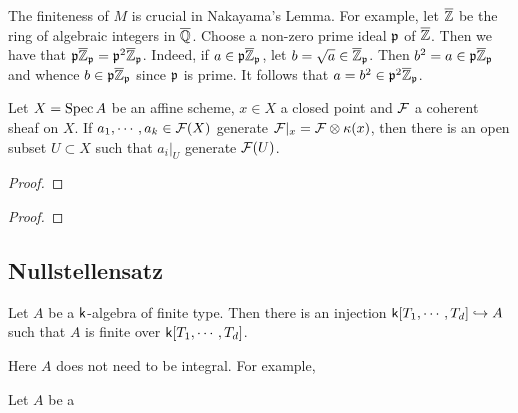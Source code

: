     \begin{remark}\label{rem: counterexample of Nakayama's lemma when M is not finite}
        The finiteness of $M$ is crucial in Nakayama's Lemma.
        For example, let \(\overline{{\mathbb{Z}}}\) be the ring of algebraic integers in \(\overline{{\mathbb{Q}}}\).
        Choose a non-zero prime ideal \({\mathfrak{p}}\) of \(\overline{{\mathbb{Z}}}\).
        Then we have that \({\mathfrak{p}} \overline{{\mathbb{Z}}}_{\mathfrak{p}}= {\mathfrak{p}}^2 \overline{{\mathbb{Z}}}_{\mathfrak{p}}\).
        Indeed, if \(a \in {\mathfrak{p}} \overline{{\mathbb{Z}}}_{\mathfrak{p}}\), let \(b = \sqrt{a} \in \overline{{\mathbb{Z}}}_{\mathfrak{p}}\).
        Then \(b^2 = a \in {\mathfrak{p}} \overline{{\mathbb{Z}}}_{\mathfrak{p}}\) and whence \(b \in {\mathfrak{p}} \overline{{\mathbb{Z}}}_{\mathfrak{p}}\) since \({\mathfrak{p}}\) is prime.
        It follows that \(a = b^2 \in {\mathfrak{p}}^2 \overline{{\mathbb{Z}}}_{\mathfrak{p}}\).
    \end{remark}

    \begin{proposition}\label{prop: geometric form of Nakayama's lemma}
        Let $X = \operatorname{Spec} A$ be an affine scheme, $x\in X$ a closed point and ${\mathcal{F}}$ a coherent sheaf on $X$.
        If $a_1,\cdots,a_k \in {\mathcal{F}}(X)$ generate ${\mathcal{F}}|_x = {\mathcal{F}} \otimes {\kappa}(x)$, then there is an open subset $U \subset X$ such that $a_i|_U$ generate ${\mathcal{F}}(U)$. 
    \end{proposition}
    \begin{proof}
    \end{proof}

    \begin{corollary}\label{cor: upper semicontinuity of dimension of restriction of coherent sheaf to fiber}
        
    \end{corollary}
    \begin{proof}
    \end{proof}

\subsection{Nullstellensatz}

    \begin{theorem}\label{thm: Noether's Normalization Lemma}
        Let $A$ be a ${\mathsf{k}}$-algebra of finite type.
        Then there is an injection ${\mathsf{k}}[T_1,\cdots,T_d] \hookrightarrow A$ such that $A$ is finite over ${\mathsf{k}}[T_1,\cdots,T_d]$.
    \end{theorem}

    \begin{remark}
        Here $A$ does not need to be integral. 
        For example, 
    \end{remark}

    \begin{theorem}\label{thm: Nullstellensatz}
        Let $A$ be a 
    \end{theorem}
